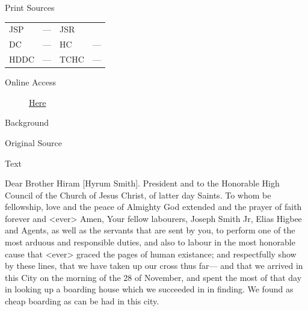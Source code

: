 			\begin{description}
				\item[Print Sources]
			\end{description}

				\begin{tabular}{p{0.5in}p{1in}p{0.5in}p{1in}}
				JSP	 	& ---		& JSR 		&  \\
				DC	 	& ---		& HC 		& --- \\
				HDDC 	& ---		& TCHC 		& --- \\
				\end{tabular}
			
			\begin{description}
				\item[Online Access] \href{https://www.josephsmithpapers.org/paper-summary/letter-to-hyrum-smith-and-nauvoo-high-council-5-december-1839/1}{Here}
			\end{description}
			
			\begin{description}
				\item[Background]
			\end{description}
			
			
			\begin{description}
				\item[Original Source]
			\end{description}
			
			
			\begin{description}
				\item[Text]
			\end{description}
			

				Dear Brother Hiram [Hyrum Smith]. President and to the Honorable High Council of the Church of Jesus Christ, of latter day Saints. To whom be fellowship, love and the peace of Almighty God extended and the prayer of faith forever and <ever> Amen, Your fellow labourers, Joseph Smith Jr, Elias Higbee and Agents, as well as the servants that are sent by you, to perform one of the most arduous and responsible duties, and also to labour in the most honorable cause that <ever> graced the pages of human existance; and respectfully show by these lines, that we have taken up our cross thus far--- and that we arrived in this City on the morning of the 28 of November, and spent the most of that day in looking up a boarding house which we succeeded in in finding. We found as cheap boarding as can be had in this city.

